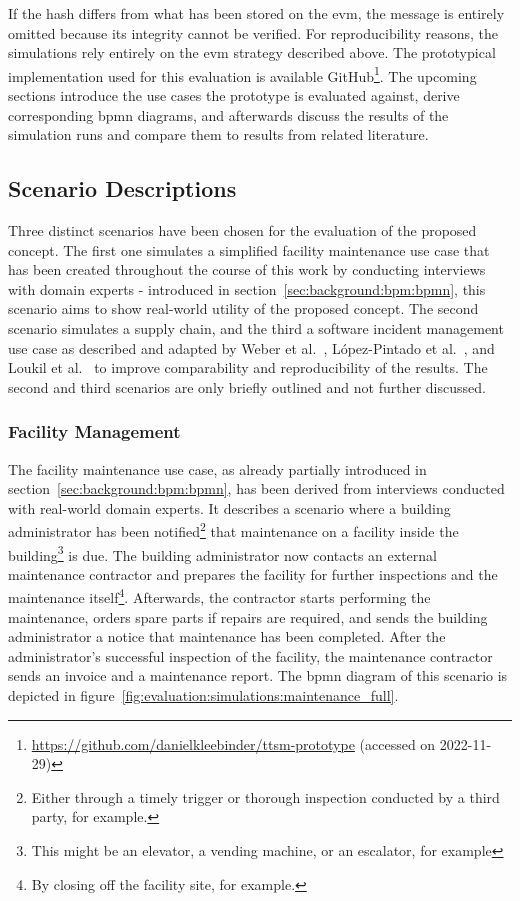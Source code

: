 If the hash differs from what has been stored on the \gls{evm}, the message is entirely omitted because its integrity cannot be verified. For reproducibility reasons, the simulations rely entirely on the \gls{evm} strategy described above. The prototypical implementation used for this evaluation is available GitHub\footnote{\url{https://github.com/danielkleebinder/ttsm-prototype} (accessed on 2022-11-29)}. The upcoming sections introduce the use cases the prototype is evaluated against, derive corresponding \gls{bpmn} diagrams, and afterwards discuss the results of the simulation runs and compare them to results from related literature.


\subsection{Scenario Descriptions}
\label{sec:evaluation:simulations:descriptions}
Three distinct scenarios have been chosen for the evaluation of the proposed concept. The first one simulates a simplified facility maintenance use case that has been created throughout the course of this work by conducting interviews with domain experts - introduced in section~\ref{sec:background:bpm:bpmn}, this scenario aims to show real-world utility of the proposed concept. The second scenario simulates a supply chain, and the third a software incident management use case as described and adapted by Weber et al.~\cite{untrusted_bp_execution_using_blockchain}, López-Pintado et al.~\cite{interpreted_bp_on_blockchain_weber}, and Loukil et al.~\cite{interpreted_bp_on_blockchain_loukil} to improve comparability and reproducibility of the results. The second and third scenarios are only briefly outlined and not further discussed.

\subsubsection{Facility Management}
\label{sec:evaluation:simulations:descriptions:fm}
The facility maintenance use case, as already partially introduced in section~\ref{sec:background:bpm:bpmn}, has been derived from interviews conducted with real-world domain experts. It describes a scenario where a building administrator has been notified\footnote{Either through a timely trigger or thorough inspection conducted by a third party, for example.} that maintenance on a facility inside the building\footnote{This might be an elevator, a vending machine, or an escalator, for example} is due. The building administrator now contacts an external maintenance contractor and prepares the facility for further inspections and the maintenance itself\footnote{By closing off the facility site, for example.}. Afterwards, the contractor starts performing the maintenance, orders spare parts if repairs are required, and sends the building administrator a notice that maintenance has been completed. After the administrator's successful inspection of the facility, the maintenance contractor sends an invoice and a maintenance report. The \gls{bpmn} diagram of this scenario is depicted in figure~\ref{fig:evaluation:simulations:maintenance_full}.

